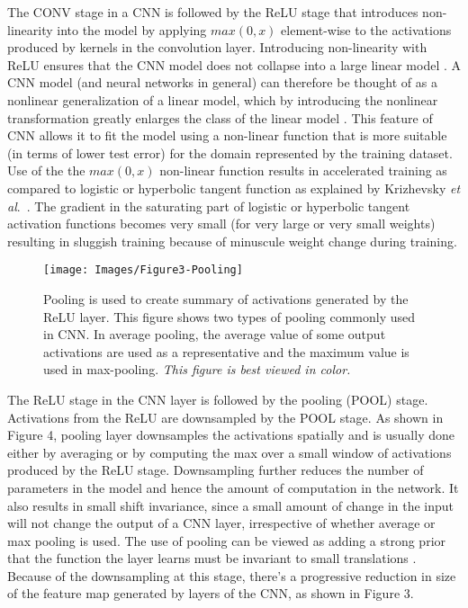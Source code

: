 \documentclass [11pt,letterpaper ,twoside ,openany ]{report}
\begin{document}
    The CONV stage in a CNN is followed by the ReLU stage that introduces non-linearity into the model by applying \(max (0,x)\) element-wise to the activations produced by kernels in the convolution layer. Introducing non-linearity with ReLU ensures that the CNN model does not collapse into a large linear model \cite{hastie-et-al-2014, hastie-et-al-2008, Murphy2012}. A CNN model (and neural networks in general) can therefore be thought of as a nonlinear generalization of a linear model, which by introducing the nonlinear transformation greatly enlarges the class of the linear model \cite{hastie-et-al-2008}. This feature of CNN allows it to fit the model using a non-linear function that is more suitable (in terms of lower test error) for the domain represented by the training dataset. Use of the the \(max (0,x)\) non-linear function results in accelerated training as compared to logistic or hyperbolic tangent function as explained by Krizhevsky \textit{et al}.\ \cite{krizhevsky2012imagenet}. The gradient in the saturating part of logistic or hyperbolic tangent activation functions becomes very small (for very large or very small weights) resulting in sluggish training because of minuscule weight change during training.

    \begin{wrapfigure}{r}{0.5\textwidth}
        \begin{center}
            \texttt{[image: Images/Figure3-Pooling]}
        \end{center}
        \caption{Pooling is used to create summary of activations generated by the ReLU layer. This figure shows two types of pooling commonly used in CNN. In average pooling, the average value of some output activations are used as a representative and the maximum value is used in max-pooling. \textit{This figure is best viewed in color.}}
    \end{wrapfigure}    

    The ReLU stage in the CNN layer is followed by the pooling (POOL) stage. Activations from the ReLU are downsampled by the POOL stage. As shown in Figure 4, pooling layer downsamples the activations spatially and is usually done either by averaging or by computing the max over a small window of activations produced by the ReLU stage. Downsampling further reduces the number of parameters in the model and hence the amount of computation in the network. It also results in small shift invariance, since a small amount of change in the input will not change the output of a CNN layer, irrespective of whether average or max pooling is used. The use of pooling can be viewed as adding a strong prior that the function the layer learns must be invariant to small translations \cite{Goodfellow-et-al-2016}. Because of the downsampling at this stage, there's a progressive reduction in size of the feature map generated by layers of the CNN, as shown in Figure 3. \\ 
\end{document}
